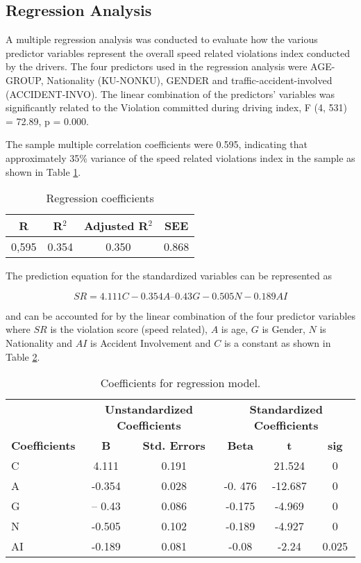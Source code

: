 \documentclass[preprint,12pt,a4paper,authoryear]{elsarticle}
\begin{document}
\subsection{Regression Analysis}

A multiple regression analysis was conducted to evaluate how the various predictor variables represent the overall speed related violations index conducted by the drivers. The four predictors used in the regression analysis were AGE-GROUP, Nationality (KU-NONKU), GENDER and traffic-accident-involved (ACCIDENT-INVO). The linear combination of the predictors' variables was significantly related to the Violation committed during driving index, F (4, 531) = 72.89, p = 0.000.

The sample multiple correlation coefficients were 0.595, indicating that approximately 35\% variance of the speed related violations index in the sample as shown in Table  \ref{tab:regression}.

\begin{table}[H]
\centering
\caption{Regression coefficients}
\label{tab:regression}
\begin{tabular}{@{}cccc@{}}
\toprule
\textbf{R} & \textbf{R$^{2}$} & \textbf{Adjusted  R$^{2}$} & \textbf{SEE} \\ \midrule
0,595 & 0.354 & 0.350 & 0.868 \\ \bottomrule
\end{tabular}
\end{table}

The prediction equation for the standardized variables can be represented as 

\begin{equation}
SR= 4.111C -0.354A – 0.43G -0.505N -0.189AI
\end{equation}

\noindent
and can be accounted for by the linear combination of the four predictor variables where $SR$ is the violation score (speed related),  $A$ is age, $G$ is Gender, $N$ is Nationality and $AI$ is Accident Involvement and $C$ is a constant as shown in Table \ref{tab:regression-coef}.

\begin{table}[H]
\centering
\caption{Coefficients for regression model.}
\label{tab:regression-coef}
\begin{tabular}{@{}lccccc@{}}
\toprule
\textbf{} & \multicolumn{2}{c}{\textbf{Unstandardized Coefficients}} & \multicolumn{3}{c}{\textbf{Standardized Coefficients}} \\ 
\textbf{Coefficients} & \textbf{B} & \textbf{Std. Errors} & \textbf{Beta} & \textbf{t} & \textbf{sig} \\ \midrule
C & 4.111 & 0.191 &  & 21.524 & 0 \\
A & -0.354 & 0.028 & -0. 476 & -12.687 & 0 \\
G & – 0.43 & 0.086 & -0.175 & -4.969 & 0 \\
N & -0.505 & 0.102 & -0.189 & -4.927 & 0 \\
AI & -0.189 & 0.081 & -0.08 & -2.24 & 0.025 \\ \bottomrule
\end{tabular}
\end{table}
\end{document}
